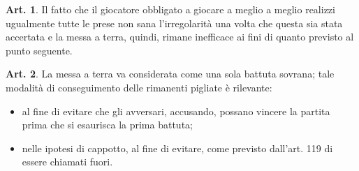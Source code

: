 \documentclass[italian,a4paper]{article}
\theoremstyle{definition}
\newtheorem{art}{Art.}
\begin{document}
\begin{art}
Il fatto che il giocatore obbligato a giocare a meglio a meglio realizzi ugualmente tutte le prese non sana l'irregolarità una volta che questa sia stata accertata e la messa a terra, quindi, rimane inefficace ai fini di quanto previsto al punto seguente.
\end{art}
\begin{art}
La messa a terra va considerata come una sola battuta sovrana; tale modalità di conseguimento delle rimanenti pigliate è rilevante:
\begin{itemize}
\item     al fine di evitare che gli avversari, accusando, possano vincere la partita prima che si esaurisca la prima battuta;
\item    nelle ipotesi di cappotto, al fine di evitare, come previsto dall'art. 119 di essere chiamati fuori.
    \end{itemize}
\end{art}
\end{document}
